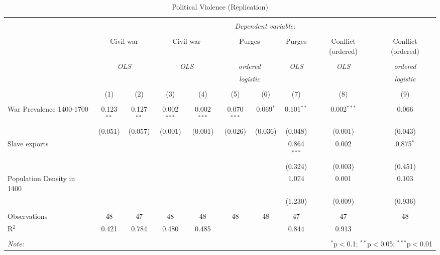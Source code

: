 
\begin{table}[!htbp] \centering 
  \caption{Political Violence (Replication)} 
  \label{} 
\footnotesize 
\begin{tabular}{@{\extracolsep{2pt}}lccccccccc} 
\\[-1.8ex]\hline 
\hline \\[-1.8ex] 
 & \multicolumn{9}{c}{\textit{Dependent variable:}} \\ 
\cline{2-10} 
\\[-1.8ex] & \multicolumn{2}{c}{Civil war} & \multicolumn{2}{c}{Civil war} & \multicolumn{2}{c}{Purges} & Purges & Conflict (ordered) & Conflict (ordered) \\ 
\\[-1.8ex] & \multicolumn{2}{c}{\textit{OLS}} & \multicolumn{2}{c}{\textit{OLS}} & \multicolumn{2}{c}{\textit{ordered}} & \textit{OLS} & \textit{OLS} & \textit{ordered} \\ 
 & \multicolumn{2}{c}{\textit{}} & \multicolumn{2}{c}{\textit{}} & \multicolumn{2}{c}{\textit{logistic}} & \textit{} & \textit{} & \textit{logistic} \\ 
\\[-1.8ex] & (1) & (2) & (3) & (4) & (5) & (6) & (7) & (8) & (9)\\ 
\hline \\[-1.8ex] 
 War Prevalence 1400-1700 & 0.123$^{**}$ & 0.127$^{**}$ & 0.002$^{***}$ & 0.002$^{***}$ & 0.070$^{***}$ & 0.069$^{*}$ & 0.101$^{**}$ & 0.002$^{***}$ & 0.066 \\ 
  & (0.051) & (0.057) & (0.001) & (0.001) & (0.026) & (0.036) & (0.048) & (0.001) & (0.043) \\ 
  Slave exports &  &  &  &  &  &  & 0.864$^{***}$ & 0.002 & 0.875$^{*}$ \\ 
  &  &  &  &  &  &  & (0.324) & (0.003) & (0.451) \\ 
  Population Density in 1400 &  &  &  &  &  &  & 1.074 & 0.001 & 0.103 \\ 
  &  &  &  &  &  &  & (1.230) & (0.009) & (0.936) \\ 
 \hline \\[-1.8ex] 
Observations & 48 & 47 & 48 & 48 & 48 & 48 & 47 & 47 & 48 \\ 
R$^{2}$ & 0.421 & 0.784 & 0.480 & 0.485 &  &  & 0.844 & 0.913 &  \\ 
\hline 
\hline \\[-1.8ex] 
\textit{Note:}  & \multicolumn{9}{r}{$^{*}$p$<$0.1; $^{**}$p$<$0.05; $^{***}$p$<$0.01} \\ 
\end{tabular} 
\end{table} 
